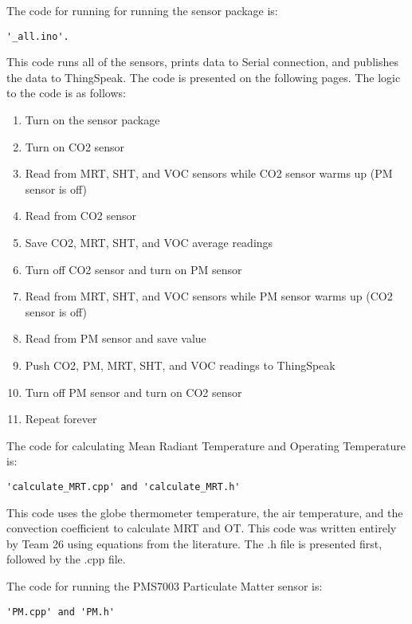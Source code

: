 \documentclass[12pt,letterpaper,titlepage]{article}
\begin{document}
\maketitle
The code for running for running the sensor package is:
\begin{verbatim}
'_all.ino'.
\end{verbatim}
This code runs all of the sensors, prints data to Serial connection, and publishes the data to ThingSpeak. The code is presented on the following pages. The logic to the code is as follows:
\begin{enumerate}
\setlength{\itemsep}{1pt}
\item Turn on the sensor package
\item Turn on CO2 sensor
\item Read from MRT, SHT, and VOC sensors while CO2 sensor warms up (PM sensor is off)
\item Read from CO2 sensor
\item Save CO2, MRT, SHT, and VOC average readings
\item Turn off CO2 sensor and turn on PM sensor
\item Read from MRT, SHT, and VOC sensors while PM sensor warms up (CO2 sensor is off)
\item Read from PM sensor and save value
\item Push CO2, PM, MRT, SHT, and VOC readings to ThingSpeak
\item Turn off PM sensor and turn on CO2 sensor
\item Repeat forever
\end{enumerate}

The code for calculating Mean Radiant Temperature and Operating Temperature is:
\begin{verbatim}
'calculate_MRT.cpp' and 'calculate_MRT.h'
\end{verbatim}
This code uses the globe thermometer temperature, the air temperature, and the convection coefficient to calculate MRT and OT. This code was written entirely by Team 26 using equations from the literature. The .h file is presented first, followed by the .cpp file.


The code for running the PMS7003 Particulate Matter sensor is:
\begin{verbatim}
'PM.cpp' and 'PM.h'
\end{verbatim}
\end{document}
